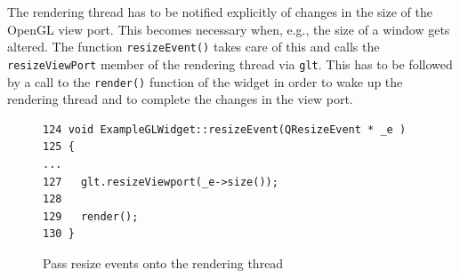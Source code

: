 \documentclass[jou,noapacite]{apa}
\begin{document}
%
The rendering thread has to be notified explicitly of changes in the size of
the OpenGL view port.
%
This becomes necessary when, e.g., the size of a window gets altered.
%
The function \lstinline|resizeEvent()| takes care of this and calls
the \lstinline|resizeViewPort| member of the rendering thread
via \lstinline|glt|.
%
This has to be followed by a call to the \lstinline|render()| function of the
widget in order to wake up the rendering thread and to complete the changes in
the view port.
%
\begin{figure}[h]
\begin{lstlisting}[basicstyle=\scriptsize]
124 void ExampleGLWidget::resizeEvent(QResizeEvent * _e )
125 {
...
127   glt.resizeViewport(_e->size());
128
129   render();
130 }
\end{lstlisting}
\caption{Pass resize events onto the rendering thread}
\end{figure}
\end{document}
